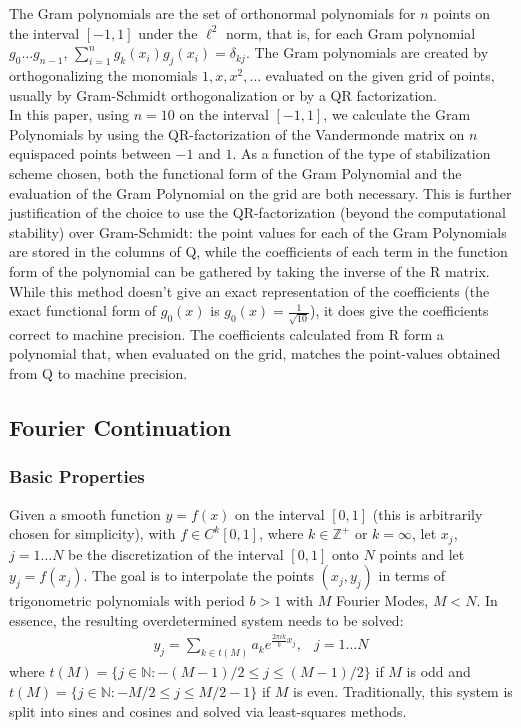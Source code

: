 \documentclass[11pt]{amsart}
\begin{document}
The Gram polynomials are the set of orthonormal polynomials for $n$ points on the interval $[-1,1]$ under the $\ell^2$ norm, that is, for each Gram polynomial $g_0 \ldots g_{n-1}$,  $\displaystyle \sum_{i=1}^n g_k(x_i)g_j(x_i) = \delta_{kj}$. 
The Gram polynomials are created by orthogonalizing the monomials $1,x,x^2,\ldots$ evaluated on the given grid of points, usually by Gram-Schmidt orthogonalization or by a QR factorization. 
\\ 
In this paper, using $n=10$ on the interval $[-1,1]$, we calculate the Gram Polynomials by using the QR-factorization of the Vandermonde matrix on $n$ equispaced points between $-1$ and $1$.  As a function of the type of stabilization scheme chosen, both the functional form of the Gram Polynomial and the evaluation of the Gram Polynomial on the grid are both necessary.  This is further justification of the choice to use the QR-factorization (beyond the computational stability) over Gram-Schmidt:  the point values for each of the Gram Polynomials are stored in the columns of Q, while the coefficients of each term in the function form of the polynomial can be gathered by taking the inverse of the R matrix. While this method doesn't give an exact representation of the coefficients (the exact functional form of $g_0(x)$ is $g_0(x)=\frac{1}{\sqrt{10}}$), it does give the coefficients correct to machine precision.  The coefficients calculated from R form a polynomial that, when evaluated on the grid, matches the point-values obtained from Q to machine precision. 

\subsection{Fourier Continuation}


\subsubsection{Basic Properties} 
Given a smooth function $y=f(x)$ on the interval $[0,1]$ (this is arbitrarily chosen for simplicity), with $f\in C^k[0,1]$, where $k \in \mathbb{Z}^{+}$ or $k=\infty$, let $x_j$, $j=1 \ldots N$ be the discretization of the interval $[0,1]$ onto $N$ points and let $y_j  = f(x_j)$.  
The goal is to interpolate the points $(x_j,y_j)$ in terms of trigonometric polynomials with period $b>1$ with $M$ Fourier Modes, $M<N$.  
In essence, the resulting overdetermined system needs to be solved:
\begin{eqnarray}
y_j=\sum_{k\in t(M)} a_k e^{\frac{2\pi i k}{b}x_j}, &j=1\ldots N
\end{eqnarray}
where $t(M)=\{j\in \mathbb{N}: -(M-1)/2 \leq j \leq (M-1)/2\}$ if $M$ is odd and $t(M)=\{j\in \mathbb{N}: -M/2\leq j \leq M/2-1\}$ if $M$ is even. 
Traditionally, this system is split into sines and cosines and solved via least-squares methods\cite{FC1}.  
\end{document}
